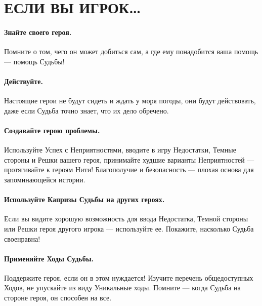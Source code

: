 \section*{ЕСЛИ ВЫ ИГРОК…}

\paragraph{Знайте своего героя.} Помните о том, чего он может добиться сам, а где ему понадобится ваша помощь — помощь Судьбы!
\paragraph{Действуйте.} Настоящие герои не будут сидеть и ждать у моря погоды, они будут действовать, даже если Судьба точно знает, что их дело обречено.
\paragraph{Создавайте герою проблемы.} Используйте Успех с Неприятностями, вводите в игру Недостатки, Темные стороны и Решки вашего героя, принимайте худшие варианты Неприятностей — протягивайте к героям Нити! Благополучие и безопасность — плохая основа для запоминающейся истории.
\paragraph{Используйте Капризы Судьбы на других героях.} Если вы видите хорошую возможность для ввода Недостатка, Темной стороны или Решки героя другого игрока — используйте ее. Покажите, насколько Судьба своенравна!
\paragraph{Применяйте Ходы Судьбы.} Поддержите героя, если он в этом нуждается! Изучите перечень общедоступных Ходов, не упускайте из виду Уникальные ходы. Помните — когда Судьба на стороне героя, он способен на все.